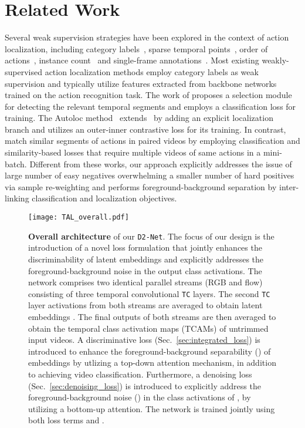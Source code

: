 \documentclass[10pt,twocolumn,letterpaper]{article}
\def\proposed{\texttt{D2-Net}{}}
\begin{document}
\section{Related Work}
Several weak supervision strategies have been explored in the context of action localization, including category labels~\cite{hideseek,stpn,untrimnets,wtalc,autoloc,zhai2020twostream}, sparse temporal points~\cite{point-supervision}, order of actions~\cite{order-constraints-kuehne,order-constraints-bojan}, instance count~\cite{3cnet,star} and single-frame annotations~\cite{ma2020sf}. 
Most existing weakly-supervised action localization methods employ category labels as weak supervision and typically utilize features extracted from backbone networks~\cite{tsn,kinetics} trained on the action recognition task. 
The work of \cite{untrimnets} proposes a selection module for detecting the relevant temporal segments and employs a classification loss for training. 
The Autoloc method~\cite{autoloc} extends~\cite{untrimnets} by adding an explicit localization branch and utilizes an outer-inner contrastive loss for its training.
In contrast,~\cite{wtalc,dml} match similar segments of actions in paired videos by employing classification and similarity-based losses that require multiple videos of same actions in a mini-batch. 
Different from these works, our approach explicitly addresses the issue of large number of easy negatives overwhelming a smaller number of hard positives via sample re-weighting and performs foreground-background separation by inter-linking classification and localization objectives.




\begin{figure*}[t]
    \centering
    \texttt{[image: TAL\_overall.pdf]}
     \vspace{-1mm}
    \caption{\textbf{Overall architecture} of our \proposed{}. The focus of our design is the introduction of a novel loss formulation that jointly enhances the discriminability of latent embeddings and explicitly addresses the foreground-background noise in the output class activations. 
The network comprises two identical parallel streams (RGB and flow) consisting of three temporal convolutional \texttt{TC} layers. The second \texttt{TC} layer activations from both streams are averaged to obtain latent embeddings . The final outputs of both streams are then averaged to obtain the temporal class activation maps (TCAMs)  of untrimmed input videos. 
A discriminative loss  (Sec.~\ref{sec:integrated_loss}) is introduced to enhance the foreground-background separability (\textcolor{blue}{}) of embeddings  by utlizing a top-down attention mechanism, 
    in addition to achieving video classification. 
    Furthermore, a denoising loss  (Sec.~\ref{sec:denoising_loss}) is introduced to explicitly address the foreground-background noise (\textcolor{red}{}) in the class activations of , by utilizing a bottom-up attention.
The network is trained jointly using both loss terms  and .\vspace{-0.27cm}
    }
    \label{fig:overall_arch}
\end{figure*}
\end{document}
